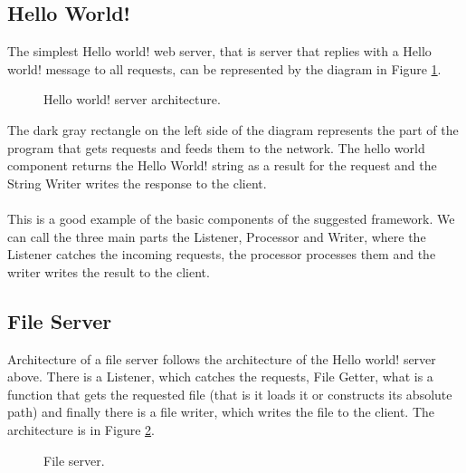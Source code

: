 \documentclass[12pt,a4paper]{article}
\begin{document}
\subsection{Hello World!}
\label{sec:helloWorld}
The simplest Hello world! web server, that is server that replies with a 
Hello world! message to all requests, can be represented by the diagram
in Figure \ref{fig:helloWorld}.

\begin{figure}[h]
\centering
{}
\caption[scale=1.0]{Hello world! server architecture.}
\label{fig:helloWorld}
\end{figure}

The dark gray rectangle on the left side of the diagram represents the 
part of the program that gets requests and feeds them to the network.
The hello world component returns the Hello World! string as a result 
for the request and the String Writer writes the response to the client.
\\
\\
This is a good example of the basic components of the suggested framework.
We can call the three main parts the Listener, Processor and Writer, where
the Listener catches the incoming requests, the processor processes them
and the writer writes the result to the client.

\subsection{File Server}
Architecture of a file server follows the architecture of the Hello world!
server above. There is a Listener, which catches the requests,
File Getter, what is a function that gets the requested file (that is it loads it or 
constructs its absolute path) and finally there is a file writer, which
writes the file to the client. The architecture is in Figure \ref{fig:fileServer}.
\\
\begin{figure}[h]
\centering
{}
\caption[scale=1.0]{File server.}
\label{fig:fileServer}
\end{figure}
\end{document}
